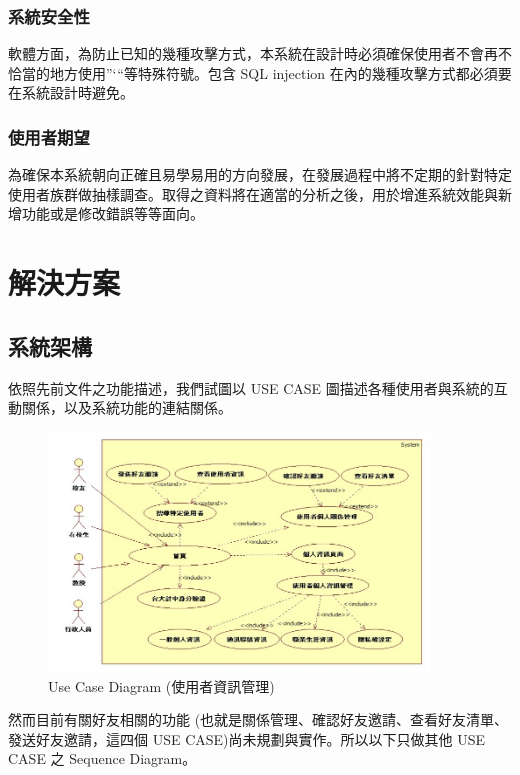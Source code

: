 \documentclass[11pt]{article}
\begin{document}
\subsubsection{系統安全性}
軟體方面，為防止已知的幾種攻擊方式，本系統在設計時必須確保使用者不會再不恰當的地方使用”‘“等特殊符號。包含 SQL injection 在內的幾種攻擊方式都必須要在系統設計時避免。
\subsubsection{使用者期望}
為確保本系統朝向正確且易學易用的方向發展，在發展過程中將不定期的針對特定使用者族群做抽樣調查。取得之資料將在適當的分析之後，用於增進系統效能與新增功能或是修改錯誤等等面向。

\section{解決方案}

\subsection{系統架構}

依照先前文件之功能描述，我們試圖以 USE CASE 圖描述各種使用者與系統的互動關係，以及系統功能的連結關係。

\begin{figure}[H]
\centering
\includegraphics[width=0.9\textwidth]{img/use01.png}
\caption{Use Case Diagram (使用者資訊管理)}
\end{figure}

然而目前有關好友相關的功能 (也就是關係管理、確認好友邀請、查看好友清單、發送好友邀請，這四個 USE CASE)尚未規劃與實作。所以以下只做其他 USE CASE 之 Sequence Diagram。
\end{document}
